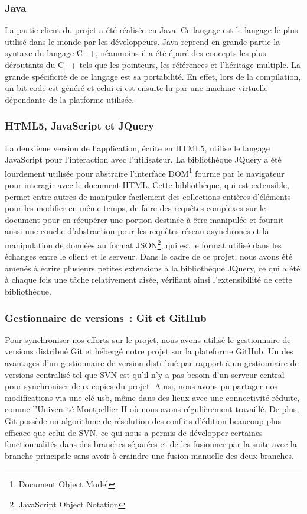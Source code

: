 \documentclass[a4paper,11pt,french]{article}
\begin{document}
\subsubsection{Java}
La partie client du projet a été réalisée en Java. Ce langage est le langage le plus utilisé dans le monde par les développeurs. Java reprend en grande partie la syntaxe du langage C++, néanmoins il a été épuré des concepts les plus déroutants du C++ tels que les pointeurs, les références et l'héritage multiple. La grande spécificité de ce langage est sa portabilité. En effet, lors de la compilation, un bit code est généré et celui-ci est ensuite lu par une machine virtuelle dépendante de la platforme utilisée.

\subsubsection{HTML5, JavaScript et JQuery}

La deuxième version de l'application, écrite en HTML5, utilise le langage JavaScript pour l'interaction avec l'utilisateur. La bibliothèque JQuery a été lourdement utilisée pour abstraire l'interface DOM\footnote{Document Object Model} fournie par le navigateur pour interagir avec le document HTML. Cette bibliothèque, qui est extensible, permet entre autres de manipuler facilement des collections entières d'éléments pour les modifier en même temps, de faire des requêtes complexes sur le document pour en récupérer une portion destinée à être manipulée et
fournit aussi une couche d'abstraction pour les requêtes réseau asynchrones et la manipulation de données au format JSON\footnote{JavaScript Object Notation}, qui est le format utilisé dans les échanges entre le client et le serveur. Dans le cadre de ce projet, nous avons été amenés à écrire plusieurs petites extensions à la bibliothèque JQuery, ce qui a été à chaque fois une tâche relativement aisée, vérifiant ainsi l'extensibilité de cette bibliothèque.

\subsubsection{Gestionnaire de versions~: Git et GitHub}

Pour synchroniser nos efforts sur le projet, nous avons utilisé le gestionnaire de versions distribué Git et hébergé notre projet sur la plateforme GitHub. Un des avantages d'un gestionnaire de version distribué par rapport à un gestionnaire de versions centralisé tel que SVN est qu'il n'y a pas besoin d'un serveur central pour synchroniser deux copies du projet. Ainsi, nous avons pu partager nos modifications via une clé usb, même dans des lieux avec une connectivité réduite, comme l'Université Montpellier II où nous avons régulièrement travaillé. 
De plus, Git possède un algorithme de résolution des conflits d'édition beaucoup plus efficace que celui de SVN, ce qui nous a permis de développer certaines fonctionnalités dans des branches séparées et de les fusionner par la suite avec la branche principale sans avoir à craindre une fusion manuelle des deux branches.
\end{document}
